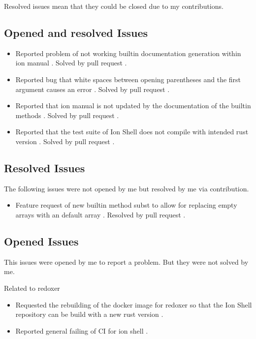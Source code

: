 Resolved issues mean that they could be closed due to my contributions.

\subsection{Opened and resolved Issues}

\begin{itemize}
	\item Reported problem of not working builtin documentation generation within ion manual \cite{issue_builtin_generation}. Solved by pull request \cite{pr_man_history_included_ion_manual}.
	\item Reported bug that white spaces between opening parentheses and the first argument causes an error \cite{issue_spaces_between_opening_parentheses}. Solved by pull request \cite{issue_spaces_between_opening_parentheses}.
	\item Reported that ion manual is not updated by the documentation of the builtin methods \cite{issue_ion_manual_not_updated}. Solved by pull request \cite{pr_subst_method}.
	\item Reported that the test suite of Ion Shell does not compile with intended rust version \cite{issue_bug_test_not_compile}. Solved by pull request \cite{pr_conf_partial_ci_fix}.
\end{itemize}

\subsection{Resolved Issues}

The following issues were not opened by me but resolved by me via contribution.

\begin{itemize}
	\item Feature request of new builtin method subst to allow for replacing empty arrays with an default array \cite{issue_subst_request}. Resolved by pull request \cite{pr_subst_method}.
\end{itemize}

\subsection{Opened Issues}

This issues were opened by me to report a problem. But they were not solved by me.

Related to \gls{redoxer}

\begin{itemize}
	\item Requested the rebuilding of the docker image for \gls{redoxer} so that the Ion Shell repository can be build with a new rust version \cite{issue_request_new_docker_version}.
	\item Reported general failing of CI for ion shell \cite{issue_failing_ci}.
\end{itemize}

